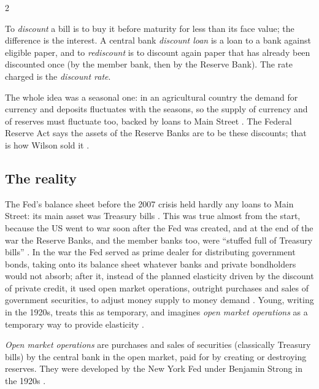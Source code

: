 \begin{paracol}{2}
\begin{definition}
To \emph{discount} a bill is to buy it before maturity for less than its face value; the difference is the interest. A central bank
\emph{discount loan} is a loan to a bank against eligible paper, and to \emph{rediscount} is to discount again paper that has already been
discounted once (by the member bank, then by the Reserve Bank). The rate charged is the \emph{discount rate}.
\end{definition}

The whole idea was a seasonal one: in an agricultural country the demand for currency and deposits fluctuates with the seasons, so the
supply of currency and of reserves must fluctuate too, backed by loans to Main Street . The Federal Reserve
Act says the assets of the Reserve Banks are to be these discounts; that is how Wilson sold it .

\subsection{The reality}
The Fed's balance sheet before the 2007 crisis held hardly any loans to Main Street: its main asset was Treasury bills .
This was true almost from the start, because the US went to war soon after the Fed was created, and at the end of the war the Reserve
Banks, and the member banks too, were ``stuffed full of Treasury bills'' . In the war the Fed served as prime dealer for
distributing government bonds, taking onto its balance sheet whatever banks and private bondholders would not absorb; after it, instead of the
planned elasticity driven by the discount of private credit, it used open market operations, outright purchases and sales of government
securities, to adjust money supply to money demand . Young, writing in the 1920s,
treats this as temporary, and imagines \emph{open market operations} as a temporary way to provide elasticity .

\begin{definition}
\emph{Open market operations} are purchases and sales of securities (classically Treasury bills) by the central bank in the open market,
paid for by creating or destroying reserves. They were developed by the New York Fed under Benjamin Strong in the 1920s .
\end{definition}


\end{paracol}
